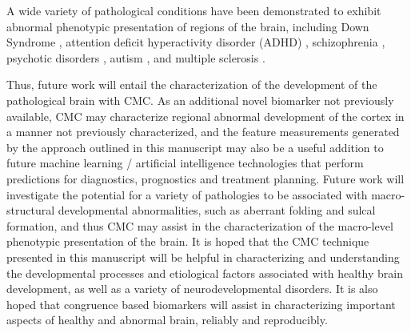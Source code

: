\documentclass{article}
\begin{document}
A wide variety of pathological conditions have been demonstrated to exhibit
abnormal phenotypic presentation of regions of the brain, including Down
Syndrome \citep{levmanStructuralMagneticResonance2019}, attention deficit
hyperactivity disorder (ADHD)
\citep{listonAtypicalPrefrontalConnectivity2011,stanleyEvidenceDevelopmentalAlterations2008},
schizophrenia
\citep{innocentiSchizophreniaNeurodevelopmentCorpus2003,keshavanSchizophreniaDueExcessive1994,feinbergCorticalPruningDevelopment1990,hoffmanCorticalPruningDevelopment1989,rimolCorticalThicknessSubcortical2010,narrMappingCorticalThickness2005,venkatasubramanianAutomatedMRIParcellation2008,vanharenChangesCorticalThickness2011,schultzReducedCorticalThickness2010,nesvagRegionalThinningCerebral2008,seitzAlterationGrayMatter2018,qiuHippocampalcorticalStructuralConnectivity2010,johnsonHippocampalShapeAbnormalities2013,mackinleyDeviantCorticalSulcation2020},
psychotic disorders \citep{bakkerCorticalMorphologyDifferences2016}, autism
\citep{khundrakpamCorticalThicknessAbnormalities2017,pereiraDifferencesCorticalStructure2018,zielinskiLongitudinalChangesCortical2014,levmanStructuralMagneticResonance2019,levmanClinicallyDetectableStructural2021},
and multiple sclerosis
\citep{brexLongitudinalStudyAbnormalities2002,losseffProgressiveCerebralAtrophy1996,chenRelatingNeocorticalPathology2004,sailerFocalThinningCerebral2003,levmanClinicallyDetectableStructural2021}.

Thus, future work will entail the characterization of the development of the
pathological brain with CMC\@. As an additional novel biomarker not previously
available, CMC may characterize regional abnormal development of the cortex
in a manner not previously characterized, and the feature measurements
generated by the approach outlined in this manuscript may also be a useful
addition to future machine learning / artificial intelligence technologies
that perform predictions for diagnostics, prognostics and treatment planning.
Future work will investigate the potential for a variety of pathologies to be
associated with macro-structural developmental abnormalities, such as
aberrant folding and sulcal formation, and thus CMC may assist in the
characterization of the macro-level phenotypic presentation of the brain. It
is hoped that the CMC technique presented in this manuscript will be helpful
in characterizing and understanding the developmental processes and
etiological factors associated with healthy brain development, as well as a
variety of neurodevelopmental disorders. It is also hoped that congruence
based biomarkers will assist in characterizing important aspects of healthy
and abnormal brain, reliably and reproducibly.
\end{document}

